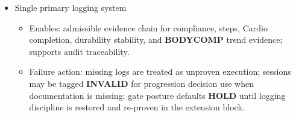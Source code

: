 \documentclass[10pt]{article}
\begin{document}
\begin{itemize}
\item Single primary logging system
  \begin{itemize}
  \item Enables: admissible evidence chain for compliance, steps, Cardio completion, durability stability, and \textbf{BODYCOMP} trend evidence; supports audit traceability.
  \item Failure action: missing logs are treated as unproven execution; sessions may be tagged \textbf{INVALID} for progression decision use when documentation is missing; gate posture defaults \textbf{HOLD} until logging discipline is restored and re-proven in the extension block.
  \end{itemize}
\end{itemize}
\end{document}
